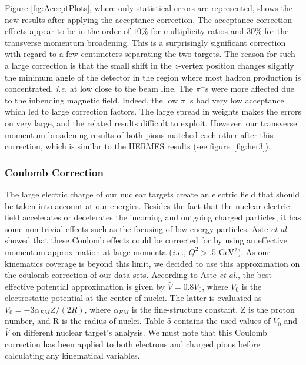 Figure \ref{fig:AcceptPlots}, where only statistical errors are 
represented, shows the new results after applying the acceptance correction.
The acceptance correction effects appear to be in the order of $10$\% for 
multiplicity ratios and $30$\% for the transverse momentum broadening. This is a surprisingly significant correction with regard to a few centimeters separating the two targets. The reason for such a large correction is that the small shift in the $z$-vertex position changes slightly the minimum angle of the detector in the region where most hadron production is concentrated, {\it i.e.} at low \pt close to the beam line. The $\pi^-$s were more affected due to the inbending magnetic field. Indeed, the low \pt $\pi^-$s had very low acceptance which led to large correction factors. The large spread in weights makes the errors on \dpt very large, and the related results difficult to exploit. However, our transverse momentum broadening 
results of both pions matched each other after this correction, which is similar 
to the HERMES results (see figure~\ref{fig:her3}).

\subsubsection{Coulomb Correction}
\label{CCor}

The large electric charge of our nuclear targets create an electric field that should be taken into account at our energies. Besides the fact that the nuclear electric field accelerates or decelerates the incoming and outgoing charged particles, it has some non trivial effects such as the focusing of low energy particles. Aste {\it et al.}~\cite{Aste:2005wc} showed that these Coulomb effects could be corrected for by using an effective momentum approximation at large momenta ({\it i.e.}, $Q^2>.5$ GeV$^2$). As our kinematics coverage is beyond this limit, we decided to use this approximation on the coulomb correction of our data-sets. According to Aste {\it et al.}, the best effective potential approximation is given by $\bar V= 0.8 V_0$, where $V_0$ is the electrostatic potential at the center of nuclei. The latter is evaluated as $V_0= -3 \alpha_{EM} Z / (2 R)$, where $\alpha_{EM}$ is the fine-structure constant, Z is the proton number, and R is the radius of nuclei. Table 5 contains the used values of $V_0$ and $\bar V$ on different nuclear target's analysis. We must note that this Coulomb correction has been applied to both electrons and charged pions before calculating any kinematical variables.

